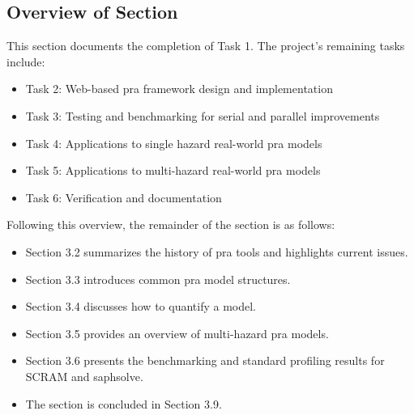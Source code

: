 \subsection{Overview of Section}
\label{sec:overview}

This section documents the completion of Task 1. The project’s remaining tasks include:
\begin{itemize}
\item Task 2: Web-based \acrshort{pra} framework design and implementation
\item Task 3: Testing and benchmarking for serial and parallel improvements
\item Task 4: Applications to single hazard real-world \acrshort{pra} models
\item Task 5: Applications to multi-hazard real-world \acrshort{pra} models
\item Task 6: Verification and documentation
\end{itemize}

Following this overview, the remainder of the section is as follows:
\begin{itemize}
\item Section 3.2 summarizes the history of \acrshort{pra} tools and highlights current issues.
\item Section 3.3 introduces common \acrshort{pra} model structures.
\item Section 3.4 discusses how to quantify a model.
\item Section 3.5 provides an overview of multi-hazard \acrshort{pra} models.
\item Section 3.6 presents the benchmarking and standard profiling results for SCRAM and \acrfull{saphsolve}.
\item The section is concluded in Section 3.9.
\end{itemize}
